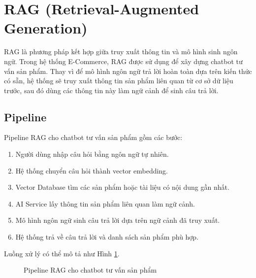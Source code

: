 \documentclass[../main.tex]{subfiles}
\begin{document}
\section{RAG (Retrieval-Augmented Generation)}

RAG là phương pháp kết hợp giữa truy xuất thông tin và mô hình sinh ngôn ngữ. Trong hệ thống E-Commerce, RAG được sử dụng để xây dựng chatbot tư vấn sản phẩm. Thay vì để mô hình ngôn ngữ trả lời hoàn toàn dựa trên kiến thức có sẵn, hệ thống sẽ truy xuất thông tin sản phẩm liên quan từ cơ sở dữ liệu trước, sau đó dùng các thông tin này làm ngữ cảnh để sinh câu trả lời.

\subsection{Pipeline}

Pipeline RAG cho chatbot tư vấn sản phẩm gồm các bước:

\begin{enumerate}
    \item Người dùng nhập câu hỏi bằng ngôn ngữ tự nhiên.
    \item Hệ thống chuyển câu hỏi thành vector embedding.
    \item Vector Database tìm các sản phẩm hoặc tài liệu có nội dung gần nhất.
    \item AI Service lấy thông tin sản phẩm liên quan làm ngữ cảnh.
    \item Mô hình ngôn ngữ sinh câu trả lời dựa trên ngữ cảnh đã truy xuất.
    \item Hệ thống trả về câu trả lời và danh sách sản phẩm phù hợp.
\end{enumerate}

Luồng xử lý có thể mô tả như Hình \ref{fig:chapter3-rag-pipeline}.

\begin{figure}[H]
    \centering
    \caption{Pipeline RAG cho chatbot tư vấn sản phẩm}
    \label{fig:chapter3-rag-pipeline}
\end{figure}
\end{document}
